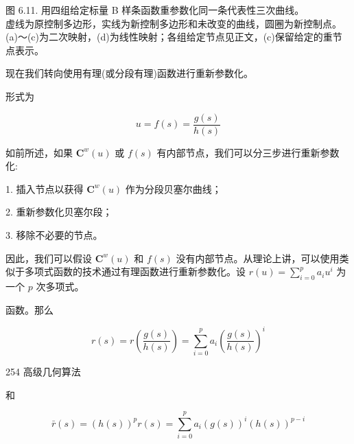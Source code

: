 \documentclass[../main.tex]{subfiles}
\begin{document}
\begin{center}
\begin{minipage}{28cm}
\vspace*{.6\baselineskip}
\centering
{}
\par\vspace{.8\baselineskip}
\par\smallskip
图 6.11. 用四组给定标量 B 样条函数重参数化同一条代表性三次曲线。\\
虚线为原控制多边形，实线为新控制多边形和未改变的曲线，圆圈为新控制点。\\
(a)～(c)为二次映射，(d)为线性映射；各组给定节点见正文，(c)保留给定的重节点表示。
\end{minipage}
\end{center}

现在我们转向使用有理(或分段有理)函数进行重新参数化。

形式为

\[
u = f\left( s\right)  = \frac{g\left( s\right) }{h\left( s\right) } \tag{6.54}
\]




如前所述，如果 \({\mathbf{C}}^{w}\left( u\right)\) 或 \(f\left( s\right)\) 有内部节点，我们可以分三步进行重新参数化:

1. 插入节点以获得 \({\mathbf{C}}^{w}\left( u\right)\) 作为分段贝塞尔曲线；

2. 重新参数化贝塞尔段；

3. 移除不必要的节点。



因此，我们可以假设 \({\mathbf{C}}^{w}\left( u\right)\) 和 \(f\left( s\right)\) 没有内部节点。从理论上讲，可以使用类似于多项式函数的技术通过有理函数进行重新参数化。设 \(r\left( u\right)  = \mathop{\sum }\limits_{{i = 0}}^{p}{a}_{i}{u}^{i}\) 为一个 \(p\) 次多项式。

函数。那么

\[
r\left( s\right)  = r\left( \frac{g\left( s\right) }{h\left( s\right) }\right)  = \mathop{\sum }\limits_{{i = 0}}^{p}{a}_{i}{\left( \frac{g\left( s\right) }{h\left( s\right) }\right) }^{i}
\]

254 高级几何算法

和

\[
\bar{r}\left( s\right)  = {\left( h\left( s\right) \right) }^{p}r\left( s\right)  = \mathop{\sum }\limits_{{i = 0}}^{p}{a}_{i}{\left( g\left( s\right) \right) }^{i}{\left( h\left( s\right) \right) }^{p - i}
\]
\end{document}
